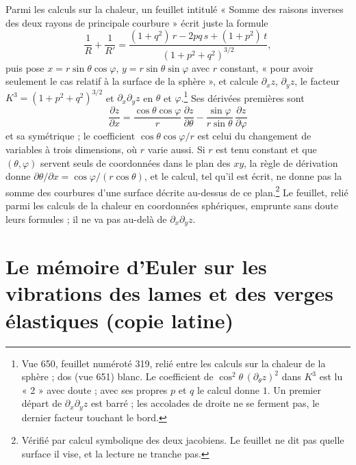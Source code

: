 \documentclass[11pt,a4paper]{article}
\begin{document}
Parmi les calculs sur la chaleur, un feuillet intitulé « Somme des raisons
inverses des deux rayons de principale courbure » écrit juste la formule
\[
\frac1R + \frac1{R'} = \frac{(1+q^2)\,r - 2pq\,s + (1+p^2)\,t}{(1+p^2+q^2)^{3/2}},
\]
puis pose $x = r\sin\theta\cos\varphi$, $y = r\sin\theta\sin\varphi$ avec $r$
constant, « pour avoir seulement le cas relatif à la surface de la sphère », et
calcule $\partial_x z$, $\partial_y z$, le facteur
$K^3 = (1+p^2+q^2)^{3/2}$ et $\partial_x\partial_y z$ en $\theta$ et
$\varphi$.\footnote{Vue 650, feuillet numéroté 319, relié entre les calculs sur la
chaleur de la sphère ; dos (vue 651) blanc. Le coefficient de
$\cos^2\theta\,(\partial_\theta z)^2$ dans $K^3$ est lu « 2 » avec doute ; avec ses
propres $p$ et $q$ le calcul donne $1$. Un premier départ de $\partial_x\partial_y
z$ est barré ; les accolades de droite ne se ferment pas, le dernier facteur
touchant le bord.} Ses dérivées premières sont
\[
\frac{\partial z}{\partial x} = \frac{\cos\theta\cos\varphi}{r}\,\frac{\partial
z}{\partial\theta} - \frac{\sin\varphi}{r\sin\theta}\,\frac{\partial
z}{\partial\varphi}
\]
et sa symétrique ; le coefficient $\cos\theta\cos\varphi/r$ est celui du
changement de variables à trois dimensions, où $r$ varie aussi. Si $r$ est tenu
constant et que $(\theta,\varphi)$ servent seuls de coordonnées dans le plan des
$xy$, la règle de dérivation donne $\partial\theta/\partial x =
\cos\varphi/(r\cos\theta)$, et le calcul, tel qu'il est écrit, ne donne pas la
somme des courbures d'une surface décrite au-dessus de ce plan.\footnote{Vérifié
par calcul symbolique des deux jacobiens. Le feuillet ne dit pas quelle surface
il vise, et la lecture ne tranche pas.} Le feuillet, relié parmi les calculs de
la chaleur en coordonnées sphériques, emprunte sans doute leurs formules ; il ne
va pas au-delà de $\partial_x\partial_y z$.

\section*{Le mémoire d'Euler sur les vibrations des lames et des verges élastiques (copie latine)}
\end{document}
